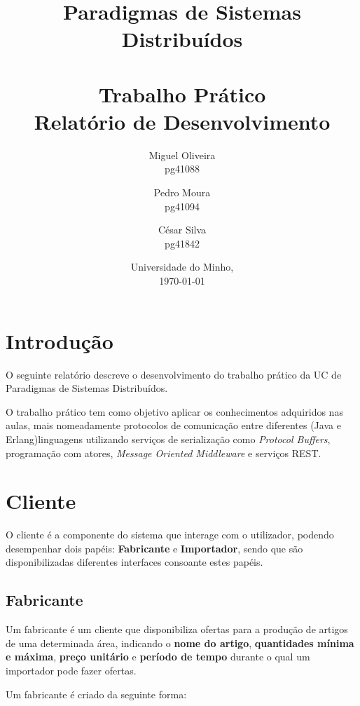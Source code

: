 \documentclass[12pt, a4paper]{report}
\begin{document}
\title{
    Paradigmas de Sistemas Distribuídos\\
    \textbf{\\Trabalho Prático}
    \large{\\Relatório de Desenvolvimento}
}

\author{
    Miguel Oliveira\\ pg41088
    \and Pedro Moura\\ pg41094
    \and César Silva\\ pg41842
}
\date{Universidade do Minho,\\\today}

\maketitle

\tableofcontents

\chapter{Introdução}
O seguinte relatório descreve o desenvolvimento do trabalho prático da UC de Paradigmas de Sistemas Distribuídos.

O trabalho prático tem como objetivo aplicar os conhecimentos adquiridos nas aulas, mais nomeadamente protocolos de comunicação entre diferentes  (Java e Erlang)linguagens utilizando serviços de serialização como \textit{Protocol Buffers}, programação com atores, \textit{Message Oriented Middleware} e serviços REST.


\chapter{Cliente}
O cliente é a componente do sistema que interage com o utilizador, podendo desempenhar dois papéis: \textbf{Fabricante} e \textbf{Importador}, sendo que são disponibilizadas diferentes interfaces consoante estes papéis.



\section{Fabricante}
Um fabricante é um cliente que disponibiliza ofertas para a produção de artigos de uma determinada área, indicando o \textbf{nome do artigo}, \textbf{quantidades mínima e máxima}, \textbf{preço unitário} e \textbf{período de tempo} durante o qual um importador pode fazer ofertas.

Um fabricante é criado da seguinte forma:
\end{document}
